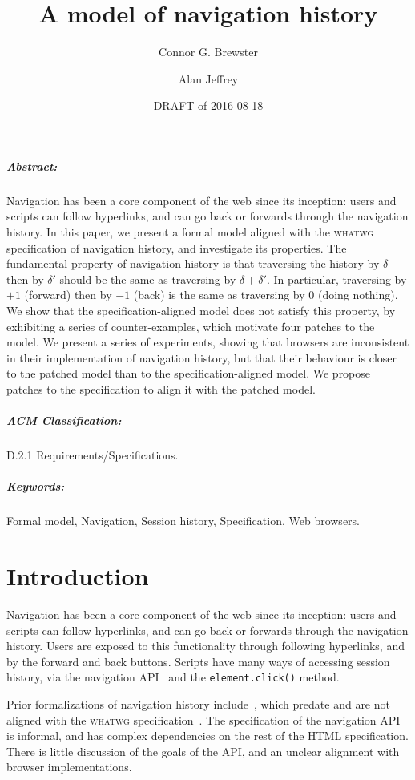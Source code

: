 \documentclass{notes}
\title{A model of navigation history}
\author{Connor G. Brewster \and Alan Jeffrey}
\date{DRAFT of 2016-08-18}
\begin{document}
\maketitle

\subparagraph{Abstract:}
Navigation has been a core component of the web since its inception:
users and scripts can follow hyperlinks, and can go back or forwards
through the navigation history. In this paper, we present a formal
model aligned with the \textsc{whatwg} specification of navigation
history, and investigate its properties. The fundamental property of
navigation history is that traversing the history by $\delta$ then by
$\delta'$ should be the same as traversing by $\delta+\delta'$. In
particular, traversing by $+1$ (forward) then by $-1$ (back) is the
same as traversing by $0$ (doing nothing). We show that the
specification-aligned model does not satisfy this property, by
exhibiting a series of counter-examples, which motivate four patches
to the model. We present a series of experiments, showing that
browsers are inconsistent in their implementation of navigation
history, but that their behaviour is closer to the patched model than
to the specification-aligned model. We propose patches to the
specification to align it with the patched model.

\subparagraph{ACM Classification:}
D.2.1 Requirements/Specifications.

\subparagraph{Keywords:}
Formal model,
Navigation,
Session history,
Specification,
Web browsers.

\section{Introduction}

Navigation has been a core component of the web since its inception:
users and scripts can follow hyperlinks, and can go back or forwards
through the navigation history. Users are exposed to this functionality
through following hyperlinks, and by the forward and back buttons.
Scripts have many ways of accessing session history, via the
navigation API~\cite[\S7.7]{whatwg} and the \verb|element.click()| method.

Prior formalizations of navigation history
include~\cite{HH:2006,Haydar:2004,HPS:2004,LHYT:2000,WP:2003}, which
predate and are not aligned with the \textsc{whatwg}
specification~\cite{whatwg}.  The specification of the navigation API
is informal, and has complex dependencies on the rest of the HTML
specification. There is little discussion of the goals
of the API, and an unclear alignment with browser implementations.
\end{document}
